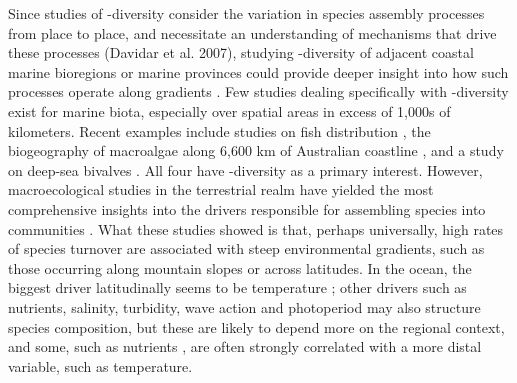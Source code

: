 \documentclass[utf8]{frontiersSCNS} %
\begin{document}
Since studies of \textbeta-diversity consider the variation in species assembly processes from place to place, and necessitate an understanding of mechanisms that drive these processes (Davidar et al. 2007), studying \textbeta-diversity of adjacent coastal marine bioregions or marine provinces \citep{Spalding2007} could provide deeper insight into how such processes operate along gradients \citep{Qian2007}. Few studies dealing specifically with \textbeta-diversity exist for marine biota, especially over spatial areas in excess of 1,000s of kilometers. Recent examples include studies on fish distribution \citep{Zintzen2010,Anderson2013}, the biogeography of macroalgae along 6,600 km of Australian coastline \citep{Leaper2011}, and a study on deep-sea bivalves \citep{McClain2011}. All four have \textbeta-diversity as a primary interest. However, macroecological studies in the terrestrial realm have yielded the most comprehensive insights into the drivers responsible for assembling species into communities \citep{Whittaker1960,Davidar2007,Qian2007,Soininen2007a}. What these studies showed is that, perhaps universally, high rates of species turnover are associated with steep environmental gradients, such as those occurring along mountain slopes or across latitudes. In the ocean, the biggest driver latitudinally seems to be temperature \citep{Tittensor2010,StuartSmith2017b,straub2016}; other drivers such as nutrients, salinity, turbidity, wave action and photoperiod may also structure species composition, but these are likely to depend more on the regional context, and some, such as nutrients \citep[\emph{e.g.}][]{Waldron1992}, are often strongly correlated with a more distal variable, such as temperature.
\end{document}
